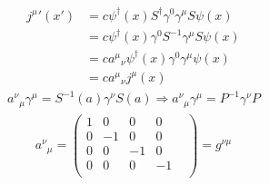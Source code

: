 \documentclass[floatfix,nofootinbib,superscriptaddress,fleqn]{revtex4}
\begin{document}
\begin{align*}
  {j^\mu}'(x')&=c\psi^\dagger(x)S^\dagger\gamma^0\gamma^\mu S\psi(x) \\
  &=c\psi^\dagger(x)\gamma^0S^{-1}\gamma^\mu S\psi(x)  \\
  &=c{a^\mu}_\nu\psi^\dagger(x)\gamma^0\gamma^\mu\psi(x)  \\
  &=c{a^\mu}_\nu j^\mu(x)
\end{align*}
\begin{align*}
  {a^\nu}_\mu\gamma^\mu = S^{-1}(a)\gamma^\nu S(a)\Longrightarrow
  {a^\nu}_\mu\gamma^\mu = P^{-1}\gamma^\nu P
\end{align*}
\begin{align*}
  {a^\nu}_\mu = \begin{pmatrix}
    1&0&0&0&  \\
    0&-1&0&0&  \\
    0&0&-1&0&  \\
    0&0&0&-1&  \\
  \end{pmatrix}
  =g^{\nu\mu}
\end{align*}
\end{document}
